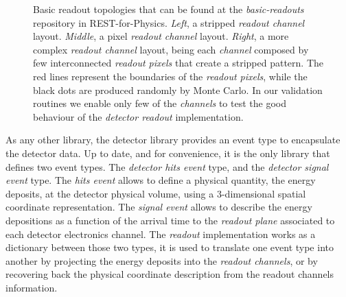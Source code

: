 \begin{figure}[htb!]
  \centering
	\caption{Basic readout topologies that can be found at the \emph{basic-readouts} repository in REST-for-Physics. \emph{Left}, a stripped \emph{readout channel} layout. \emph{Middle}, a pixel \emph{readout channel} layout. \emph{Right}, a more complex \emph{readout channel} layout, being each \emph{channel}  composed by few interconnected \emph{readout pixels} that create a stripped pattern. The red lines represent the boundaries of the \emph{readout pixels}, while the black dots are produced randomly by Monte Carlo. In our validation routines we enable only few of the \emph{channels} to test the good behaviour of the \emph{detector readout} implementation.  }\label{fig:readouts}
\end{figure}

As any other library, the detector library provides an event type to encapsulate the detector data. Up to date, and for convenience, it is the only library that defines two event types. The \emph{detector hits event} type, and the \emph{detector signal event} type. The \emph{hits event} allows to define a physical quantity, the energy deposits, at the detector physical volume, using a 3-dimensional spatial coordinate representation. The \emph{signal event} allows to describe the energy depositions as a function of the arrival time to the \emph{readout plane} associated to each detector electronics channel. The \emph{readout} implementation works as a dictionary between those two types, it is used to translate one event type into another by projecting the energy deposits into the \emph{readout channels}, or by recovering back the physical coordinate description from the readout channels information.


